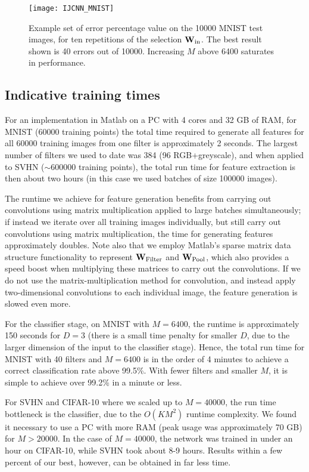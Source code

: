 \documentclass[conference]{IEEEtran}
\begin{document}
\begin{figure}[!ht]
\centering
\texttt{[image: IJCNN\_MNIST]}
 \caption{Example set of error percentage value on the 10000 MNIST test images, for ten repetitions of the selection ${\bf W}_{\rm in}$. The best result shown is 40 errors out of 10000. Increasing $M$ above 6400 saturates in performance.}
\label{fig_MNIST}
\end{figure}

\subsection{Indicative training times}

For an implementation in Matlab on a PC with 4 cores and 32 GB of RAM, for MNIST (60000 training points) the total time required to generate all features for all 60000 training images from one filter is approximately 2 seconds. The largest number of filters we used to date was 384 (96 RGB+greyscale), and when applied to SVHN ($\sim$600000 training points), the total run time for feature extraction is then about two hours (in this case we used batches of size 100000 images). 

The runtime we achieve for feature generation benefits from carrying out convolutions using matrix multiplication applied to large batches simultaneously; if instead we iterate over all training images individually, but still carry out convolutions using matrix multiplication, the time for generating features approximately doubles.   Note also that we employ Matlab's sparse matrix data structure functionality to represent ${\bf W}_{\rm Filter}$ and ${\bf W}_{\rm Pool}$, which also provides a speed boost when multiplying these matrices to carry out the convolutions.  If we do not use the matrix-multiplication method for convolution, and instead apply two-dimensional convolutions to each individual image, the feature generation is slowed even more.

For the classifier stage, on MNIST with $M=6400$, the runtime is approximately 150 seconds for $D=3$ (there is a small time penalty for smaller $D$, due to the larger dimension of the input to the classifier stage). Hence, the total run time for MNIST with 40 filters and $M=6400$ is in the order of 4 minutes to achieve a correct classification rate above  99.5\%. With fewer filters and smaller $M$, it is simple to achieve over 99.2\% in a minute or less.

For SVHN and CIFAR-10 where we scaled up to $M=40000$, the run time bottleneck is the classifier, due to the $O(KM^2)$ runtime complexity. We found it necessary to use a PC with more RAM (peak usage was approximately 70 GB) for $M>20000$. In the case of $M=40000$, the network was trained in under an hour on CIFAR-10, while SVHN took about 8-9 hours.  Results within a few percent of our best, however, can be obtained in far less time.
\end{document}
